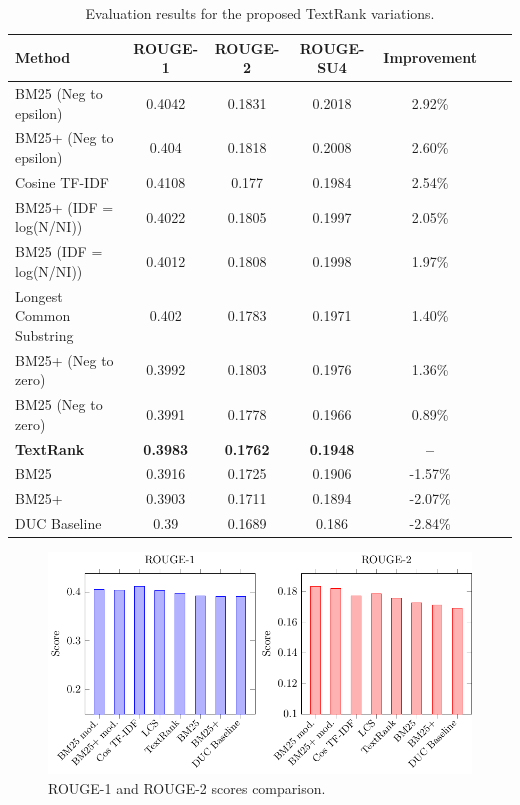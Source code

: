 \documentclass{llncs}
\begin{document}
\begin{table}
\caption{Evaluation results for the proposed TextRank variations.}
\begin{center}
\begin{tabular}{l*{5}{c}r}
\hline
\rule{0pt}{12pt}
Method & ROUGE-1 & ROUGE-2 & ROUGE-SU4 & Improvement \\[2pt]
\hline\rule{0pt}{12pt}\mbox{}\par\nobreak
BM25 (Neg to epsilon) & 0.4042 & 0.1831 & 0.2018 & 2.92\% \\
BM25+ (Neg to epsilon) & 0.404 & 0.1818 & 0.2008 & 2.60\% \\
Cosine TF-IDF & 0.4108 & 0.177 & 0.1984 & 2.54\% \\
BM25+ (IDF = log(N/NI)) & 0.4022 & 0.1805 & 0.1997 & 2.05\% \\ 
BM25 (IDF = log(N/NI)) & 0.4012 & 0.1808 & 0.1998 & 1.97\% \\ 
Longest Common Substring & 0.402 & 0.1783 & 0.1971 & 1.40\% \\
BM25+ (Neg to zero) & 0.3992 & 0.1803 & 0.1976 & 1.36\% \\ 
BM25 (Neg to zero) & 0.3991 & 0.1778 & 0.1966 & 0.89\% \\
\textbf{TextRank} & \textbf{0.3983} & \textbf{0.1762} & \textbf{0.1948} & \textbf{--}\\
BM25 & 0.3916 & 0.1725 & 0.1906 & -1.57\% \\
BM25+ & 0.3903 & 0.1711 & 0.1894 & -2.07\% \\
DUC Baseline & 0.39 & 0.1689 & 0.186 & -2.84\% \\ [2pt]
\hline
\end{tabular}
\end{center}
\end{table}

\begin{figure}[h!]
    \centering
    \includegraphics[width=1\textwidth]{rouge-scores-en.pdf}
    \caption{ROUGE-1 and ROUGE-2 scores comparison.}
\end{figure}
\end{document}

